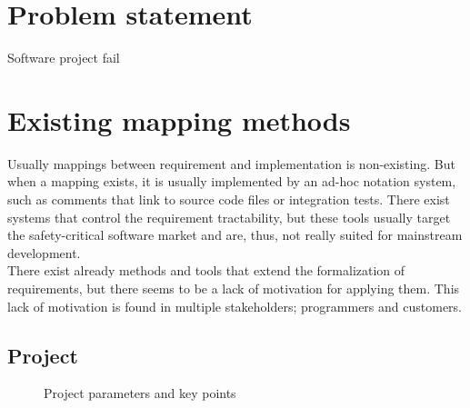 \section{Problem statement}
Software project fail \cite{verner2008} \cite{charette2005}
\section{Existing mapping methods}
Usually mappings between requirement and implementation is non-existing. But when a mapping exists, it is usually implemented by an ad-hoc notation system, such as comments that link to source code files or integration tests. There exist systems that control the requirement tractability, but these tools usually target the safety-critical software market and are, thus, not really suited for mainstream development.\\%

There exist already methods and tools that extend the formalization of requirements, but there seems to be a lack of motivation for applying them. This lack of motivation is found in multiple stakeholders; programmers and customers.

\subsection{Project}
\begin{figure}
\centering
{}
\label{fig:project_parameter_plot}
\caption{Project parameters and key points}
\end{figure}

